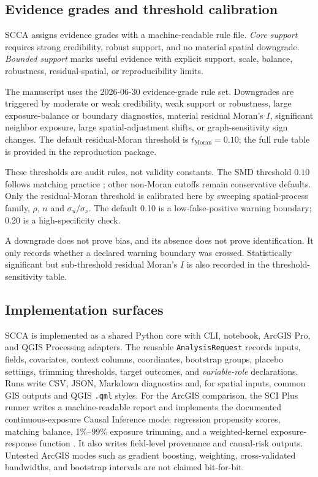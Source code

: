 \documentclass{article}
\newcommand{\ruleversion}{the 2026-06-30 evidence-grade rule set}
\begin{document}
\subsection{Evidence grades and threshold calibration}

SCCA assigns evidence grades with a machine-readable rule file. \textit{Core support} requires strong credibility, robust support, and no material spatial downgrade. \textit{Bounded support} marks useful evidence with explicit support, scale, balance, robustness, residual-spatial, or reproducibility limits.

The manuscript uses \ruleversion. Downgrades are triggered by moderate or weak credibility, weak support or robustness, large exposure-balance or boundary diagnostics, material residual Moran's $I$, significant neighbor exposure, large spatial-adjustment shifts, or graph-sensitivity sign changes. The default residual-Moran threshold is $t_{\mathrm{Moran}}=0.10$; the full rule table is provided in the reproduction package.

These thresholds are audit rules, not validity constants. The SMD threshold $0.10$ follows matching practice \citep{stuart2010matching,austin2009smd}; other non-Moran cutoffs remain conservative defaults. Only the residual-Moran threshold is calibrated here by sweeping spatial-process family, $\rho$, $n$ and $\sigma_u/\sigma_\nu$. The default 0.10 is a low-false-positive warning boundary; 0.20 is a high-specificity check.

A downgrade does not prove bias, and its absence does not prove identification. It only records whether a declared warning boundary was crossed. Statistically significant but sub-threshold residual Moran's $I$ is also recorded in the threshold-sensitivity table.

\subsection{Implementation surfaces}

SCCA is implemented as a shared Python core with CLI, notebook, ArcGIS Pro, and QGIS Processing adapters. The reusable \texttt{AnalysisRequest} records inputs, fields, covariates, context columns, coordinates, bootstrap groups, placebo settings, trimming thresholds, target outcomes, and \emph{variable-role} declarations. Runs write CSV, JSON, Markdown diagnostics and, for spatial inputs, common GIS outputs and QGIS \texttt{.qml} styles. For the ArcGIS comparison, the SCI Plus runner writes a machine-readable report and implements the documented continuous-exposure Causal Inference mode: regression propensity scores, matching balance, 1\%--99\% exposure trimming, and a weighted-kernel exposure-response function \citep{esri2026causalworks,wu2022matching,fan1996local}. It also writes field-level provenance and causal-risk outputs. Untested ArcGIS modes such as gradient boosting, weighting, cross-validated bandwidths, and bootstrap intervals are not claimed bit-for-bit.
\end{document}
